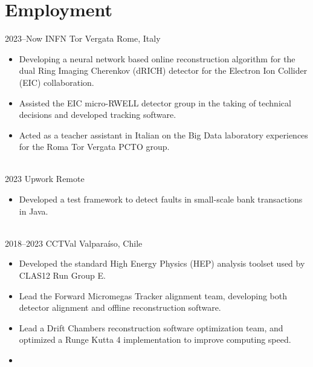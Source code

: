 \documentclass[a4paper]{cv-style}
\begin{document}
\section{Employment}
    \begin{entrylist}
        \entry
            {2023--Now}
            {INFN Tor Vergata}
            {Rome, Italy}
            {
            \begin{itemize}
                \item
                    Developing a neural network based online reconstruction algorithm for the dual Ring Imaging Cherenkov (dRICH) detector for the Electron Ion Collider (EIC) collaboration.
                \item
                    Assisted the EIC micro-RWELL detector group in the taking of technical decisions and developed tracking software.
                \item
                    Acted as a teacher assistant in Italian on the Big Data laboratory experiences for the Roma Tor Vergata PCTO group.
            \end{itemize}} \\
        \entry
            {2023}
            {Upwork}
            {Remote}
            {
            \begin{itemize}
                \item
                    Developed a test framework to detect faults in small-scale bank transactions in Java.
            \end{itemize}} \\
        \entry
            {2018--2023}
            {CCTVal}
            {Valpara\'iso, Chile}
            {
            \begin{itemize}
                \item
                    Developed the standard High Energy Physics (HEP) analysis toolset used by CLAS12 Run Group E.
                \item
                    Lead the Forward Micromegas Tracker alignment team, developing both detector alignment and offline reconstruction software.
                \item
                    Lead a Drift Chambers reconstruction software optimization team, and optimized a Runge Kutta 4 implementation to improve computing speed.
                \item

\end{itemize}}
\end{entrylist}
\end{document}
